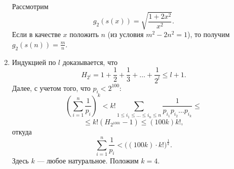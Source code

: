 \documentclass[12pt, a4paper]{article}
\begin{document}
\begin{enumerate}
Рассмотрим 
$$g_2(s(x)) = \sqrt{\frac{1+2x^2}{x^2}}.$$
Если в качестве $x$ положить $n$ (из условия $m^2 - 2n^2 = 1$), то получим $g_2(s(n)) = \frac{m}{n}$.

\item Индукцией по $l$ доказывается, что
$$H_{2^l} = 1 + \frac{1}{2} + \frac{1}{3} + \hdots + \frac{1}{2^l} \leqslant l + 1.$$
Далее, с учетом того, что $p_i < 2^{100}$:
$$\left( \sum_{i=1}^{n} \frac{1}{p_i} \right)^k < k! \sum_{1 \leqslant i_1 \leqslant \hdots \leqslant i_n \leqslant n} \frac{1}{p_{i_1} p_{i_2} \hdots p_{i_k}} \leqslant $$
$$ \leqslant k! ( H_{2^{100k}} - 1) \leqslant (100 k) k!,$$
откуда
$$\sum_{i=1}^{n} \frac{1}{p_i} < \bigl( (100 k) \cdot k! \bigr) ^{\frac{1}{k}}.$$
Здесь $k$ --- любое натуральное. Положим $k = 4$.
\end{enumerate}
\end{document}
